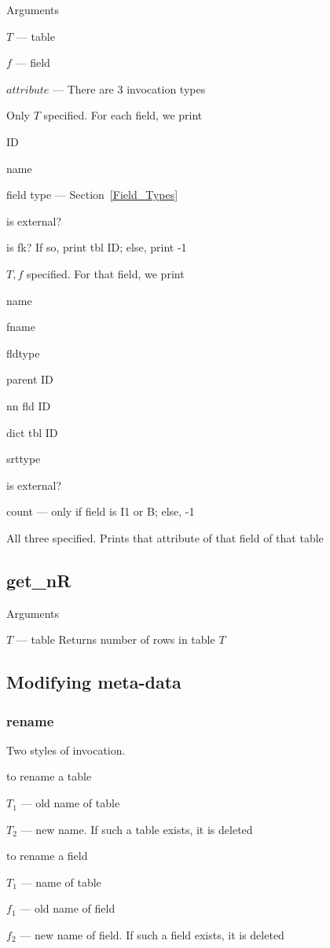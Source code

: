 Arguments
\be
\item \(T\) --- table
\item \(f\) --- field 
\item \(attribute\) --- 
\ee
There are 3 invocation types
\be
\item Only \(T\) specified.  For each field, we print
\be
\item ID
\item name
\item field type --- Section~\ref{Field_Types}
\item is external?
\item is fk? If so, print tbl ID; else, print -1
\ee
\item \(T, f\) specified. For that field, we print
\be
\item name
\item fname
\item fldtype
\item parent ID
\item nn fld ID 
\item dict tbl ID 
\item srttype
\item is external?
\item count --- only if field is I1 or B; else, -1 
\ee

\item All three specified. Prints that attribute of that field of that
table
\ee

\subsection{get\_nR}
\label{get_nR}
Arguments
\be
\item \(T\) --- table
\ee
Returns number of rows in table \(T\)


\subsection{Modifying meta-data}
\subsubsection{rename}
\label{rename}
Two styles of invocation. 
\be
\item to rename a table 
\be
\item \(T_1\) --- old name of table
\item \(T_2\) --- new name. If such a table exists, it is deleted
\ee
\item to rename a field 
\be
\item \(T_1\) --- name of table
\item \(f_1\) --- old name of field 
\item \(f_2\) --- new name of field. If such a field exists, it is
deleted
\ee
\ee

